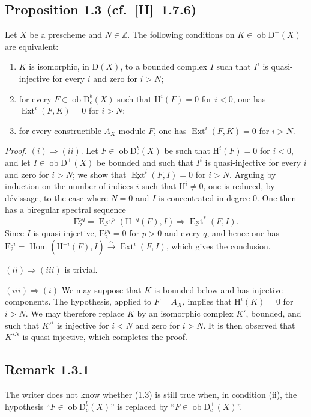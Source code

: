 \documentclass[11pt]{article}
\renewcommand{\H}{\mathrm{H}}
\DeclareMathOperator{\Hom}{Hom}
\DeclareMathOperator{\Ext}{Ext}
\newcommand{\D}{\mathrm{D}}
\newcommand{\Z}{\mathbb{Z}}
\newcommand{\E}{\mathrm{E}}
\newcommand{\ob}{\operatorname{ob}}
\providecommand{\Hom}{\operatorname{Hom}}
\providecommand{\ob}{\operatorname{ob}}
\providecommand{\Z}{\mathbb Z}
\providecommand{\Hom}{\operatorname{Hom}}
\begin{document}
\subsection*{Proposition 1.3 {\normalfont (cf.~[H]~1.7.6)}}
Let $X$ be a prescheme and $N \in \Z$. The following conditions on $K \in \ob \D^{+}(X)$ are equivalent:
\begin{enumerate}[label=(\roman*)]
\item $K$ is isomorphic, in $\D(X)$, to a bounded complex $I$ such that $I^i$ is quasi-injective for every $i$ and zero for $i > N$;
\item for every $F \in \ob \D_c^{b}(X)$ such that $\H^i(F) = 0$ for $i < 0$, one has $\underline{\Ext}^i(F,K) = 0$ for $i > N$;
\item for every constructible $A_X$-module $F$, one has $\underline{\Ext}^i(F,K) = 0$ for $i > N$.
\end{enumerate}

\emph{Proof.} $(i) \Rightarrow (ii)$. Let $F \in \ob \D_c^{b}(X)$ be such that $\H^i(F) = 0$ for $i < 0$, and let $I \in \ob \D^{+}(X)$ be bounded and such that $I^i$ is quasi-injective for every $i$ and zero for $i > N$; we show that $\underline{\Ext}^i(F,I) = 0$ for $i > N$. Arguing by induction on the number of indices $i$ such that $\H^i \neq 0$, one is reduced, by dévissage, to the case where $N = 0$ and $I$ is concentrated in degree $0$. One then has a biregular spectral sequence
\[
\E_2^{pq} = \underline{\Ext}^p(\H^{-q}(F),I) \Rightarrow \underline{\Ext}^{*}(F,I).
\]
Since $I$ is quasi-injective, $\E_2^{pq} = 0$ for $p > 0$ and every $q$, and hence one has $\E_2^{0i} = \underline{\Hom}(\H^{-i}(F),I) \xrightarrow{\sim} \underline{\Ext}^i(F,I)$, which gives the conclusion.

$(ii) \Rightarrow (iii)$ is trivial.

$(iii) \Rightarrow (i)$ We may suppose that $K$ is bounded below and has injective components. The hypothesis, applied to $F = A_X$, implies that $\H^i(K) = 0$ for $i > N$. We may therefore replace $K$ by an isomorphic complex $K'$, bounded, and such that $K'^i$ is injective for $i < N$ and zero for $i > N$. It is then observed that $K'^N$ is quasi-injective, which completes the proof.

\subsection*{Remark 1.3.1}
The writer does not know whether (1.3) is still true when, in condition (ii), the hypothesis ``$F \in \ob \D_c^{b}(X)$'' is replaced by ``$F \in \ob \D_c^{+}(X)$''.
\end{document}
